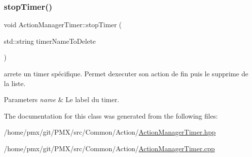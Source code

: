 \subsubsection{\texorpdfstring{stop\+Timer()}{stopTimer()}}
{\footnotesize\ttfamily void Action\+Manager\+Timer\+::stop\+Timer (\begin{DoxyParamCaption}\item[{std\+::string}]{timer\+Name\+To\+Delete }\end{DoxyParamCaption})}



arrete un timer spécifique. Permet d\textquotesingle{}executer son action de fin puis le supprime de la liste. 


\begin{DoxyParams}{Parameters}
{\em name} & Le label du timer. \\
\hline
\end{DoxyParams}


The documentation for this class was generated from the following files\+:\begin{DoxyCompactItemize}
\item 
/home/pmx/git/\+P\+M\+X/src/\+Common/\+Action/\hyperlink{ActionManagerTimer_8hpp}{Action\+Manager\+Timer.\+hpp}\item 
/home/pmx/git/\+P\+M\+X/src/\+Common/\+Action/\hyperlink{ActionManagerTimer_8cpp}{Action\+Manager\+Timer.\+cpp}\end{DoxyCompactItemize}
